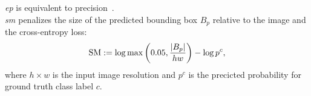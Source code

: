 \emph{\gls{ep}\autocite{wang2020score}} is equivalent to precision~.\\

\emph{\gls{sm} \autocite{dabkowski2017real}} penalizes the size of the predicted bounding
 box $B_p$ relative to the image and the cross-entropy
 loss:
\begin{equation}
	\operatorname{SM} \mathrel{:=} \log \max\left({ 0.05, \frac{\left|{B_p}\right|}{hw} }\right) - \log p^c,
\label{eq:sm}
\end{equation}
where $h \times w$ is the input image resolution and $p^c$ is the precicted probability for ground 
truth class label $c$.